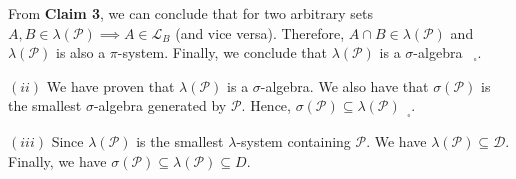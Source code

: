 \begin{proof*}
\noindent From \textbf{Claim 3}, we can conclude that for two arbitrary sets $A, B \in \lambda(\mathcal{P}) \implies A \in \mathcal{L}_B$ (and vice versa). Therefore, $A\cap B \in \lambda(\mathcal{P})$ and $\lambda(\mathcal{P})$ is also a $\pi$-system. Finally, we conclude that $\lambda(\mathcal{P})$ is a $\sigma$-algebra $_{\ \ \ \square}$.

\noindent\newline $(ii)$ We have proven that $\lambda(\mathcal{P})$ is a $\sigma$-algebra. We also have that $\sigma(\mathcal{P})$ is the smallest $\sigma$-algebra generated by $\mathcal{P}$. Hence, $\sigma(\mathcal{P})\subseteq\lambda(\mathcal{P})_{\ \ \ \square}$.

\noindent\newline $(iii)$ Since $\lambda(\mathcal{P})$ is the smallest $\lambda$-system containing $\mathcal{P}$. We have $\lambda(\mathcal{P})\subseteq \mathcal{D}$. Finally, we have $\sigma(\mathcal{P})\subseteq\lambda(\mathcal{P})\subseteq{D}$.
\end{proof*}

